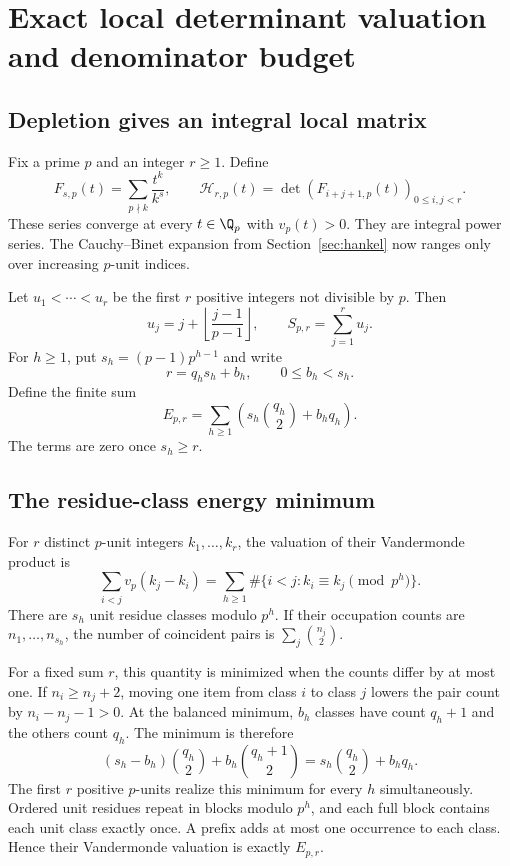 \clearpage
\section{Exact local determinant valuation and denominator budget}\label{sec:padic}
\subsection{Depletion gives an integral local matrix}
Fix a prime $p$ and an integer $r\ge1$. Define
\[
 F_{s,p}(t)=\sum_{p\nmid k}\frac{t^k}{k^s},\qquad
 \mathcal H_{r,p}(t)=\det(F_{i+j+1,p}(t))_{0\le i,j<r}.
\]
These series converge at every $t\in\Q_p$ with $v_p(t)>0$. They are integral power series. The Cauchy--Binet expansion from Section~\ref{sec:hankel} now ranges only over increasing $p$-unit indices.

Let $u_1<\cdots<u_r$ be the first $r$ positive integers not divisible by $p$. Then
\[
 u_j=j+\left\lfloor\frac{j-1}{p-1}\right\rfloor,
 \qquad S_{p,r}=\sum_{j=1}^r u_j.
\]
For $h\ge1$, put $s_h=(p-1)p^{h-1}$ and write
\[
 r=q_hs_h+b_h,\qquad 0\le b_h<s_h.
\]
Define the finite sum
\[
 E_{p,r}=\sum_{h\ge1}\left(s_h\binom{q_h}{2}+b_hq_h\right).
\]
The terms are zero once $s_h\ge r$.

\subsection{The residue-class energy minimum}
For $r$ distinct $p$-unit integers $k_1,\ldots,k_r$, the valuation of their Vandermonde product is
\[
 \sum_{i<j}v_p(k_j-k_i)
 =\sum_{h\ge1}\#\{i<j:k_i\equiv k_j\pmod{p^h}\}.
\]
There are $s_h$ unit residue classes modulo $p^h$. If their occupation counts are $n_1,\ldots,n_{s_h}$, the number of coincident pairs is $\sum_j\binom{n_j}{2}$.

For a fixed sum $r$, this quantity is minimized when the counts differ by at most one. If $n_i\ge n_j+2$, moving one item from class $i$ to class $j$ lowers the pair count by $n_i-n_j-1>0$. At the balanced minimum, $b_h$ classes have count $q_h+1$ and the others count $q_h$. The minimum is therefore
\[
 (s_h-b_h)\binom{q_h}{2}+b_h\binom{q_h+1}{2}
 =s_h\binom{q_h}{2}+b_hq_h.
\]
The first $r$ positive $p$-units realize this minimum for every $h$ simultaneously. Ordered unit residues repeat in blocks modulo $p^h$, and each full block contains each unit class exactly once. A prefix adds at most one occurrence to each class. Hence their Vandermonde valuation is exactly $E_{p,r}$.

